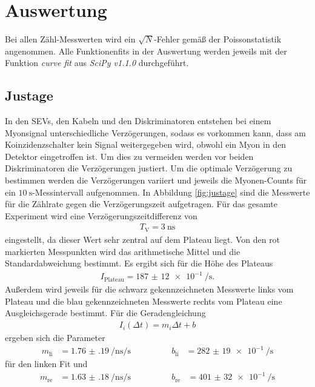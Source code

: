 \section{Auswertung}
\label{sec:Auswertung}

Bei allen Zähl-Messwerten wird ein $\sqrt{N}$-Fehler gemäß der Poissonstatistik angenommen.
Alle Funktionenfits in der Auswertung werden jeweils mit der Funktion \textit{curve fit} aus \textit{SciPy v1.1.0} durchgeführt.

\subsection{Justage}

In den SEVs, den Kabeln und den Diskriminatoren entstehen bei einem Myonsignal unterschiedliche Verzögerungen, sodass es vorkommen kann, dass
am Koinzidenzschalter kein Signal weitergegeben wird, obwohl ein Myon in den Detektor eingetroffen ist. Um dies zu vermeiden werden
vor beiden Diskriminatoren die Verzögerungen justiert. Um die optimale Verzögerung zu bestimmen werden die Verzögerungen variiert und jeweils die Myonen-Counts für ein
$\SI{10}{\second}$-Messintervall aufgenommen. In Abbildung \ref{fig:justage} sind die Messwerte für die Zählrate
gegen die Verzögerungszeit aufgetragen. Für das gesamte Experiment wird eine Verzögerungszeitdifferenz von
\begin{align*}
  T_\text{V} = \SI{3}{\nano\second}
\end{align*}
eingestellt, da dieser Wert sehr zentral auf dem Plateau liegt. Von den rot markierten Messpunkten wird das arithmetische
Mittel und die Standardabweichung bestimmt. Es ergibt sich für die Höhe des Plateaus
\begin{align}
  I_\text{Plateau} = \SI{187(12)e-1}{\per\second}.
\end{align}
Außerdem wird jeweils für die schwarz gekennzeichneten Messwerte links vom Plateau und die blau gekennzeichneten Messwerte
rechts vom Plateau eine Ausgleichsgerade bestimmt. Für die Geradengleichung
\begin{align}
  I_i(\Delta t) = m_i \Delta t + b
\end{align}
ergeben sich die Parameter
\begin{align}
  m_\text{li} &= \SI{1.76(19)}{\per\nano\second\per\second} \qquad \qquad &b_\text{li} &= \SI{282(19)e-1}{\per\second}
\end{align}
für den linken Fit und
\begin{align}
  m_\text{re} &= \SI{1.63(18)}{\per\nano\second\per\second} \qquad \qquad &b_\text{re} &= \SI{401(32)e-1}{\per\second}
\end{align}
